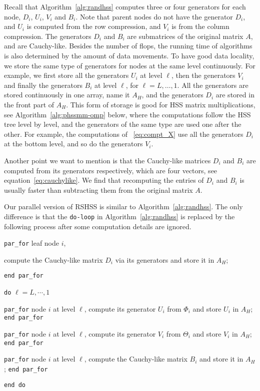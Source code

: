 \documentclass[times]{nlaauth}
\newcounter{algorithm}
\begin{document}
Recall that Algorithm~\ref{alg:randhss} computes three or four generators for each node,
$D_i$, $U_i$, $V_i$ and $B_i$. Note that parent nodes do not have
the generator $D_i$, and $U_i$ is computed from the row compression, and
$V_i$ is from the column compression. The generators $D_i$ and $B_i$ are submatrices
of the original matrix $A$, and are Cauchy-like.
Besides the number of flops,
the running time of algorithms is also determined by the amount of data movements.
To have good data locality,
we store the same type of generators for nodes at the same level continuously.
For example, we first store all the generators $U_i$ at level $\ell$,
then the generators $V_i$ and finally the generators $B_i$ at level $\ell$, for $\ell=L,\ldots,1$.
All the generators are stored continuously in one array, name it $A_H$, and the
generators $D_i$ are stored in the front part of $A_H$.
This form of storage is good for HSS matrix multiplications, see Algorithm~\ref{alg:phssmm-omp} below,
where the computations follow the HSS tree level by level, and
the generators of the same type are used one after the other.
For example, the computations of ~\eqref{eq:compt_X} use all the generators $D_i$ at the bottom level, and
so do the generators $V_i$.

Another point we want to mention is that the Cauchy-like matrices $D_i$ and $B_i$ are computed
from its generators respectively,
which are four vectors, see equation~\eqref{eq:cauchylike}.
We find that recomputing the entries of $D_i$ and $B_i$ is usually faster than subtracting them from
the original matrix $A$.

Our parallel version of RSHSS is similar to Algorithm~\ref{alg:randhss}.
The only difference is that the \texttt{do-loop} in Algorithm~\ref{alg:randhss} is replaced
by the following process after some computation details are ignored.

\begin{description}

\item \texttt{par\_for} leaf node $i$,
\item \hspace{0.5cm}  compute the Cauchy-like matrix $D_i$ via its generators and store it in $A_H$;
\item \texttt{end par\_for}

\item \texttt{do} $\ell=L,\cdots,1$
  \item \texttt{par\_for} node $i$ at level $\ell$, compute its generator $U_i$ from  $\Phi_i$ and
    store $U_i$ in $A_H$; \texttt{end par\_for}

  \item \texttt{par\_for} node $i$ at level $\ell$, compute its generator $V_i$ from  $\Theta_i$ and
    store $V_i$ in $A_H$; \texttt{end par\_for}

  \item \texttt{par\_for} node $i$ at level $\ell$, compute the Cauchy-like matrix $B_i$ and
    store it in $A_H$; \texttt{end par\_for}

\item \texttt{end do}

\end{description}
\end{document}
